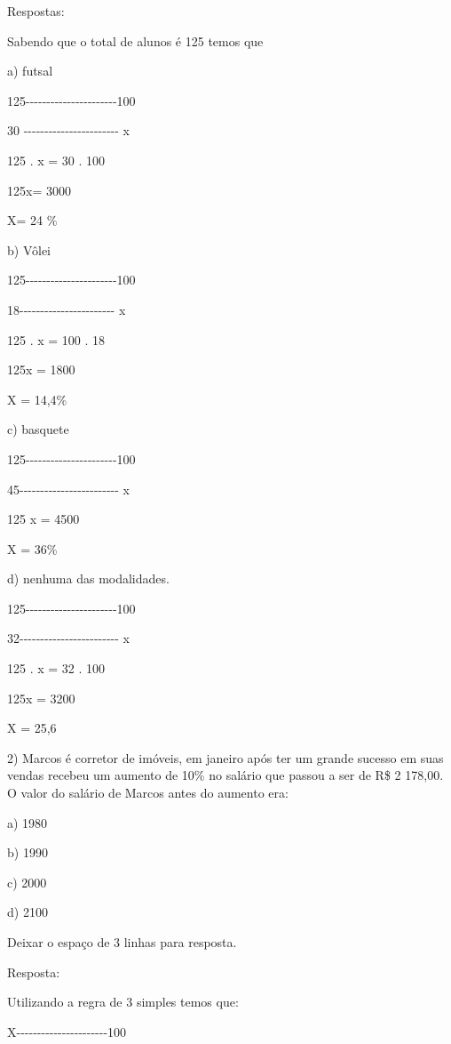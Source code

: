 Respostas:

Sabendo que o total de alunos é 125 temos que

a) futsal

125-\/-\/-\/-\/-\/-\/-\/-\/-\/-\/-\/-\/-\/-\/-\/-\/-\/-\/-\/-\/-\/-100

30 -\/-\/-\/-\/-\/-\/-\/-\/-\/-\/-\/-\/-\/-\/-\/-\/-\/-\/-\/-\/-\/-\/- x

125 . x = 30 . 100

125x= 3000

X= 24 \%

b) Vôlei

125-\/-\/-\/-\/-\/-\/-\/-\/-\/-\/-\/-\/-\/-\/-\/-\/-\/-\/-\/-\/-\/-100

18-\/-\/-\/-\/-\/-\/-\/-\/-\/-\/-\/-\/-\/-\/-\/-\/-\/-\/-\/-\/-\/-\/- x

125 . x = 100 . 18

125x = 1800

X = 14,4\%

c) basquete

125-\/-\/-\/-\/-\/-\/-\/-\/-\/-\/-\/-\/-\/-\/-\/-\/-\/-\/-\/-\/-\/-100

45-\/-\/-\/-\/-\/-\/-\/-\/-\/-\/-\/-\/-\/-\/-\/-\/-\/-\/-\/-\/-\/-\/-\/-
x

125 x = 4500

X = 36\%

d) nenhuma das modalidades.

125-\/-\/-\/-\/-\/-\/-\/-\/-\/-\/-\/-\/-\/-\/-\/-\/-\/-\/-\/-\/-\/-100

32-\/-\/-\/-\/-\/-\/-\/-\/-\/-\/-\/-\/-\/-\/-\/-\/-\/-\/-\/-\/-\/-\/-\/-
x

125 . x = 32 . 100

125x = 3200

X = 25,6

2) Marcos é corretor de imóveis, em janeiro após ter um grande sucesso
em suas vendas recebeu um aumento de 10\% no salário que passou a ser de
R\$ 2 178,00. O valor do salário de Marcos antes do aumento era:

a) 1980

b) 1990

c) 2000

d) 2100

Deixar o espaço de 3 linhas para resposta.

Resposta:

Utilizando a regra de 3 simples temos que:

X-\/-\/-\/-\/-\/-\/-\/-\/-\/-\/-\/-\/-\/-\/-\/-\/-\/-\/-\/-\/-\/-100


